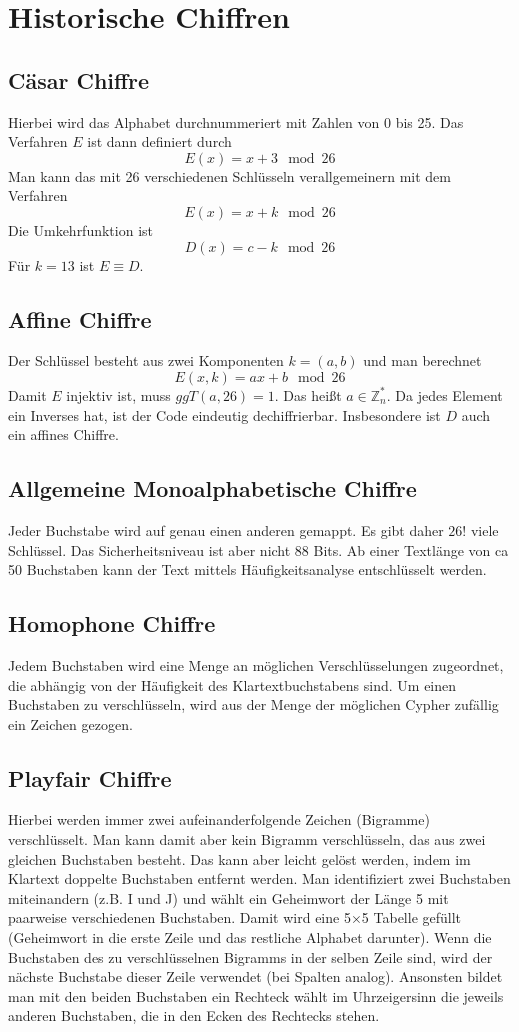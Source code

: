 \documentclass[a4paper, 12pt]{article}
\theoremstyle{plain}
\theoremstyle{definition}
\theoremstyle{lemma}
\theoremstyle{remark}
\theoremstyle{corollary}
\theoremstyle{example}
\begin{document}
	\section{Historische Chiffren}
	\subsection{Cäsar Chiffre}
	Hierbei wird das Alphabet durchnummeriert mit Zahlen von 0 bis 25. Das Verfahren $E$ ist dann definiert durch \[E(x) = x+3 \mod 26\]
	Man kann das mit 26 verschiedenen Schlüsseln verallgemeinern mit dem Verfahren \[E(x) = x+k \mod 26\]
	Die Umkehrfunktion ist \[D(x) = c-k \mod 26\]
	Für $k=13$ ist $E\equiv D$.
	\subsection{Affine Chiffre}
	Der Schlüssel besteht aus zwei Komponenten $k = (a,b)$ und man berechnet \[E(x,k) = ax+b \mod 26\]
	Damit $E$ injektiv ist, muss $ggT(a,26) = 1$. Das heißt $a \in \mathbb{Z}_n^*$. Da jedes Element ein Inverses hat, ist der Code eindeutig dechiffrierbar. Insbesondere ist $D$ auch ein affines Chiffre.
	\subsection{Allgemeine Monoalphabetische Chiffre}
	Jeder Buchstabe wird auf genau einen anderen gemappt. Es gibt daher $26!$ viele Schlüssel. Das Sicherheitsniveau ist aber nicht 88 Bits. Ab einer Textlänge von ca 50 Buchstaben kann der Text mittels Häufigkeitsanalyse entschlüsselt werden.
	\subsection{Homophone Chiffre}
	Jedem Buchstaben wird eine Menge an möglichen Verschlüsselungen zugeordnet, die abhängig von der Häufigkeit des Klartextbuchstabens sind. Um einen Buchstaben zu verschlüsseln, wird aus der Menge der möglichen Cypher zufällig ein Zeichen gezogen.
	\subsection{Playfair Chiffre}
	Hierbei werden immer zwei aufeinanderfolgende Zeichen (Bigramme) verschlüsselt. Man kann damit aber kein Bigramm verschlüsseln, das aus zwei gleichen Buchstaben besteht. Das kann aber leicht gelöst werden, indem im Klartext doppelte Buchstaben entfernt werden. Man identifiziert zwei Buchstaben miteinandern (z.B. I und J) und wählt ein Geheimwort der Länge 5 mit paarweise verschiedenen Buchstaben. Damit wird eine 5$\times$5 Tabelle gefüllt (Geheimwort in die erste Zeile und das restliche Alphabet darunter). Wenn die Buchstaben des zu verschlüsselnen Bigramms in der selben Zeile sind, wird der nächste Buchstabe dieser Zeile verwendet (bei Spalten analog). Ansonsten bildet man mit den beiden Buchstaben ein Rechteck wählt im Uhrzeigersinn die jeweils anderen Buchstaben, die in den Ecken des Rechtecks stehen.
\end{document}
